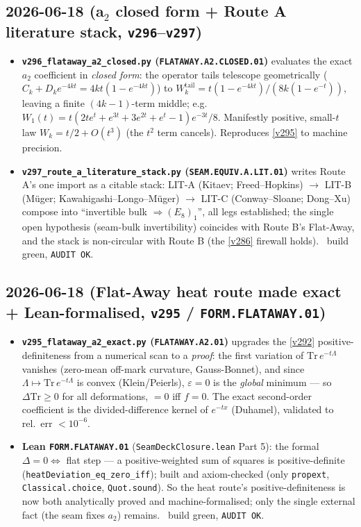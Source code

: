 \subsection*{2026-06-18 (a$_2$ closed form + Route A literature stack, \texttt{v296}--\texttt{v297})}
\begin{itemize}
\item \textbf{\texttt{v296\_flataway\_a2\_closed.py} (\texttt{FLATAWAY.A2.CLOSED.01})} evaluates the exact $a_2$
  coefficient in \emph{closed form}: the operator tails telescope geometrically
  ($C_k+D_k e^{-4kt}=4kt(1-e^{-4kt})$) to $W_k^{\mathrm{tail}}=t(1-e^{-4kt})/(8k(1-e^{-t}))$, leaving a finite
  $(4k{-}1)$-term middle; e.g.\ $W_1(t)=t(2t e^{t}+e^{3t}+3e^{2t}+e^{t}-1)e^{-3t}/8$. Manifestly positive,
  small-$t$ law $W_k=t/2+O(t^3)$ (the $t^2$ term cancels). Reproduces \vref{v295} to machine precision.
\item \textbf{\texttt{v297\_route\_a\_literature\_stack.py} (\texttt{SEAM.EQUIV.A.LIT.01})} writes Route A's one
  import as a citable stack: LIT-A (Kitaev; Freed--Hopkins) $\to$ LIT-B (M\"uger; Kawahigashi--Longo--M\"uger)
  $\to$ LIT-C (Conway--Sloane; Dong--Xu) compose into ``invertible bulk $\Rightarrow(E_8)_1$'', all legs
  established; the single open hypothesis (seam-bulk invertibility) coincides with Route B's Flat-Away, and the
  stack is non-circular with Route B (the \vref{v286} firewall holds). \mE\ build green, \texttt{AUDIT OK}.
\end{itemize}

\subsection*{2026-06-18 (Flat-Away heat route made exact + Lean-formalised, \texttt{v295} / \texttt{FORM.FLATAWAY.01})}
\begin{itemize}
\item \textbf{\texttt{v295\_flataway\_a2\_exact.py} (\texttt{FLATAWAY.A2.01})} upgrades the \vref{v292}
  positive-definiteness from a numerical scan to a \emph{proof}: the first variation of
  $\mathrm{Tr}\,e^{-t\Lambda}$ vanishes (zero-mean off-mark curvature, Gauss-Bonnet), and since
  $\Lambda\mapsto\mathrm{Tr}\,e^{-t\Lambda}$ is convex (Klein/Peierls), $\varepsilon{=}0$ is the \emph{global}
  minimum --- so $\Delta\mathrm{Tr}\ge0$ for all deformations, $=0$ iff $f=0$. The exact second-order
  coefficient is the divided-difference kernel of $e^{-tx}$ (Duhamel), validated to rel.\ err $<10^{-6}$.
\item \textbf{Lean \texttt{FORM.FLATAWAY.01}} (\texttt{SeamDeckClosure.lean} Part 5): the formal
  $\Delta{=}0\Leftrightarrow$ flat step --- a positive-weighted sum of squares is positive-definite
  (\texttt{heatDeviation\_eq\_zero\_iff}); built and axiom-checked (only \texttt{propext},
  \texttt{Classical.choice}, \texttt{Quot.sound}). So the heat route's positive-definiteness is now both
  analytically proved and machine-formalised; only the single external fact (the seam fixes $a_2$) remains.
  \mE\ build green, \texttt{AUDIT OK}.
\end{itemize}


